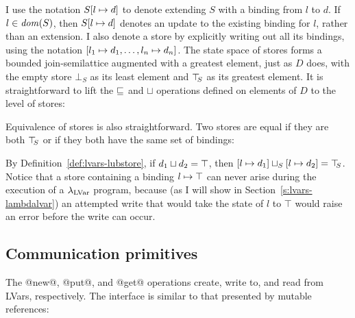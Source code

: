 I use the notation $S[l \mapsto d]$ to denote extending $S$ with a
binding from $l$ to $d$.  If $l \in \mathit{dom}(S)$, then $S[l \mapsto d]$
denotes an update to the existing binding for $l$, rather than an
extension.  I also denote a store by explicitly writing out all its
bindings, using the notation $\left[ l_1 \mapsto d_1,
  \dots, l_n \mapsto d_n \right]$.  The state space of stores
forms a bounded join-semilattice augmented with a greatest element,
just as $D$ does, with the empty store $\bot_S$ as its least element
and $\top\hspace{-0.85mm}_{S}$ as its greatest element.  It is straightforward to lift
the $\sqsubseteq$ and $\sqcup$ operations defined on elements of $D$ to
the level of stores:

\LVarsDefLeqStore

\LVarsDefLubStore

Equivalence of stores is also straightforward.  Two stores are equal
if they are both $\top\hspace{-0.85mm}_{S}$ or if they both have the same set of
bindings:

\LVarsDefEqStore

By Definition~\ref{def:lvars-lubstore}, if $d_1 \sqcup d_2 =
\top$, then
$\left[ l \mapsto d_1 \right] \sqcup_{S} \left[ l \mapsto d_2 \right]
= \top\hspace{-0.85mm}_{S}$.  Notice that a store containing a binding
$l \mapsto \top$ can never arise during the execution of a
$\lambda_{\textrm{LVar}}$ program, because (as I will show in
Section~\ref{s:lvars-lambdalvar}) an attempted write that would take
the state of $l$ to $\top$ would raise an error before the write can
occur.

\subsection{Communication primitives}\label{subsection:lvars-communication-primitives}

The @new@, @put@, and @get@ operations create, write to, and read
from LVars, respectively. The interface is similar to that presented
by mutable references:


